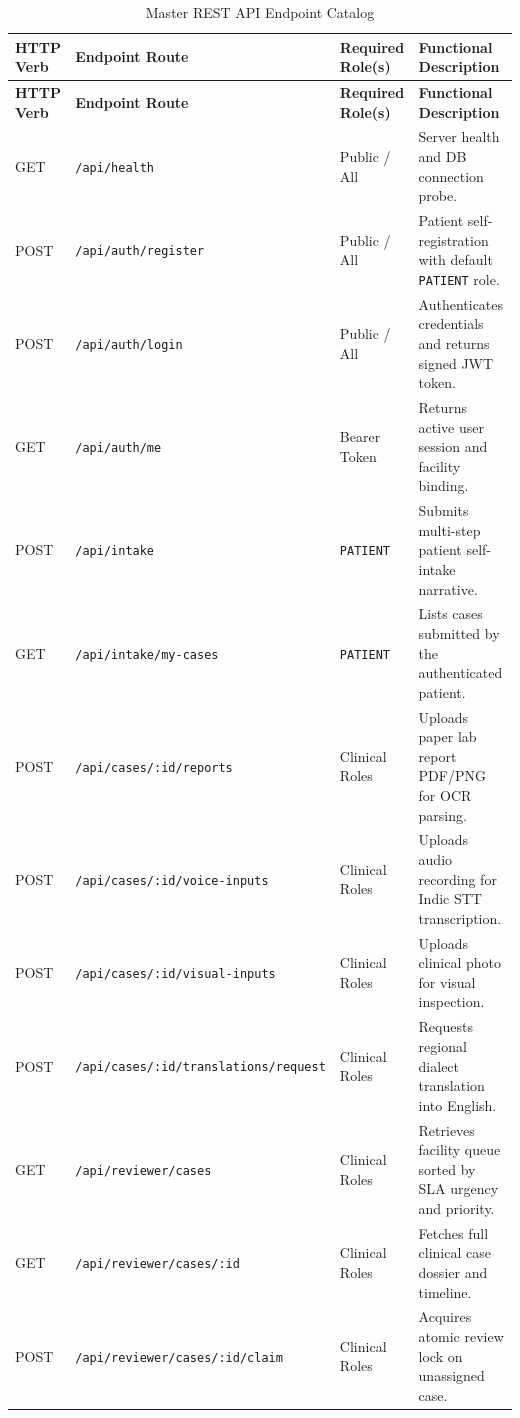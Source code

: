 \documentclass[11pt,a4paper,oneside]{report}
\begin{document}
\begin{longtable}{llp{2.6cm}p{4.8cm}}
  \caption{Master REST API Endpoint Catalog} \label{tab:master_api} \\
  \toprule
  \textbf{HTTP Verb} & \textbf{Endpoint Route} & \textbf{Required Role(s)} & \textbf{Functional Description} \\
  \midrule
  \endfirsthead
  \toprule
  \textbf{HTTP Verb} & \textbf{Endpoint Route} & \textbf{Required Role(s)} & \textbf{Functional Description} \\
  \midrule
  \endhead
  \bottomrule
  \endfoot
  GET & \texttt{/api/health} & Public / All & Server health and DB connection probe. \\
  POST & \texttt{/api/auth/register} & Public / All & Patient self-registration with default \texttt{PATIENT} role. \\
  POST & \texttt{/api/auth/login} & Public / All & Authenticates credentials and returns signed JWT token. \\
  GET & \texttt{/api/auth/me} & Bearer Token & Returns active user session and facility binding. \\
  \addlinespace
  POST & \texttt{/api/intake} & \texttt{PATIENT} & Submits multi-step patient self-intake narrative. \\
  GET & \texttt{/api/intake/my-cases} & \texttt{PATIENT} & Lists cases submitted by the authenticated patient. \\
  \addlinespace
  POST & \texttt{/api/cases/:id/reports} & Clinical Roles & Uploads paper lab report PDF/PNG for OCR parsing. \\
  POST & \texttt{/api/cases/:id/voice-inputs} & Clinical Roles & Uploads audio recording for Indic STT transcription. \\
  POST & \texttt{/api/cases/:id/visual-inputs} & Clinical Roles & Uploads clinical photo for visual inspection. \\
  POST & \texttt{/api/cases/:id/translations/request} & Clinical Roles & Requests regional dialect translation into English. \\
  \addlinespace
  GET & \texttt{/api/reviewer/cases} & Clinical Roles & Retrieves facility queue sorted by SLA urgency and priority. \\
  GET & \texttt{/api/reviewer/cases/:id} & Clinical Roles & Fetches full clinical case dossier and timeline. \\
  POST & \texttt{/api/reviewer/cases/:id/claim} & Clinical Roles & Acquires atomic review lock on unassigned case. \\

\end{longtable}
\end{document}
